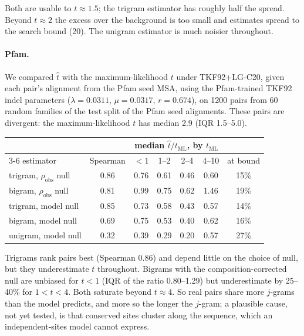 \documentclass[11pt]{article}
\begin{document}
Both are usable to $t\approx1.5$; the trigram estimator has roughly half the
spread. Beyond $t\approx2$ the excess over the background is too small and
estimates spread to the search bound (20). The unigram estimator is much
noisier throughout.

\paragraph{Pfam.} We compared $\hat t$ with the maximum-likelihood $t$ under TKF92+LG-C20, given
each pair's alignment from the Pfam seed MSA, using the Pfam-trained TKF92
indel parameters ($\lambda=0.0311$, $\mu=0.0317$, $r=0.674$), on 1200 pairs
from 60 random families of the test split of the Pfam seed alignments. These pairs are
divergent: the maximum-likelihood $t$ has median 2.9 (IQR 1.5--5.0).

\begin{center}
\small
\begin{tabular}{lcccccc}
\toprule
& & \multicolumn{4}{c}{median $\hat t/t_{\mathrm{ML}}$, by $t_{\mathrm{ML}}$} & \\
\cmidrule(lr){3-6}
estimator & Spearman & $<1$ & 1--2 & 2--4 & 4--10 & at bound\\
\midrule
trigram, $\rho_{\mathrm{obs}}$ null & 0.86 & 0.76 & 0.61 & 0.46 & 0.60 & 15\%\\
bigram, $\rho_{\mathrm{obs}}$ null  & 0.81 & 0.99 & 0.75 & 0.62 & 1.46 & 19\%\\
trigram, model null                 & 0.85 & 0.73 & 0.58 & 0.43 & 0.57 & 14\%\\
bigram, model null                  & 0.69 & 0.75 & 0.53 & 0.40 & 0.62 & 16\%\\
unigram, model null                 & 0.32 & 0.39 & 0.29 & 0.20 & 0.57 & 27\%\\
\bottomrule
\end{tabular}
\end{center}

Trigrams rank pairs best (Spearman 0.86) and depend little on the choice of
null, but they underestimate $t$ throughout. Bigrams with the
composition-corrected null are unbiased for $t<1$ (IQR of the ratio
0.80--1.29) but underestimate by 25--40\% for $1<t<4$. Both saturate beyond
$t\approx4$. So real pairs share more $j$-grams than the model predicts, and
more so the longer the $j$-gram; a plausible cause, not yet tested, is that
conserved sites cluster along the sequence, which an independent-sites model
cannot express.
\end{document}
